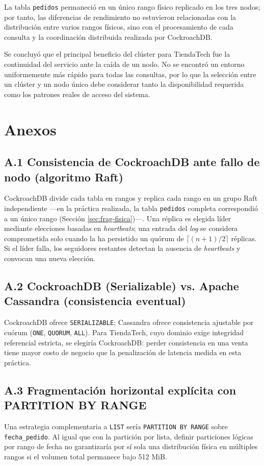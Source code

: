 \documentclass[10pt,letterpaper]{article}
\begin{document}
La tabla \texttt{pedidos} permaneció en un único rango físico replicado en los tres nodos; por tanto, las diferencias de rendimiento no estuvieron relacionadas con la distribución entre varios rangos físicos, sino con el procesamiento de cada consulta y la coordinación distribuida realizada por CockroachDB.

Se concluyó que el principal beneficio del clúster para TiendaTech fue la continuidad del servicio ante la caída de un nodo. No se encontró un entorno uniformemente más rápido para todas las consultas, por lo que la selección entre un clúster y un nodo único debe considerar tanto la disponibilidad requerida como los patrones reales de acceso del sistema.

\section{Anexos}

\subsection*{A.1 Consistencia de CockroachDB ante fallo de nodo (algoritmo Raft)}
CockroachDB divide cada tabla en rangos y replica cada rango en un grupo Raft independiente —en la práctica realizada, la tabla \texttt{pedidos} completa correspondió a un único rango (Sección \ref{sec:frag-fisica})—. Una réplica es elegida líder mediante elecciones basadas en \textit{heartbeats}; una entrada del \textit{log} se considera comprometida solo cuando la ha persistido un quórum de $\lceil (n+1)/2 \rceil$ réplicas. Si el líder falla, los seguidores restantes detectan la ausencia de \textit{heartbeats} y convocan una nueva elección.

\subsection*{A.2 CockroachDB (Serializable) vs. Apache Cassandra (consistencia eventual)}
\label{sec:anexoA2}
CockroachDB ofrece \texttt{SERIALIZABLE}; Cassandra ofrece consistencia ajustable por cuórum (\texttt{ONE}, \texttt{QUORUM}, \texttt{ALL}). Para TiendaTech, cuyo dominio exige integridad referencial estricta, se elegiría CockroachDB: perder consistencia en una venta tiene mayor costo de negocio que la penalización de latencia medida en esta práctica.

\subsection*{A.3 Fragmentación horizontal explícita con PARTITION BY RANGE}
Una estrategia complementaria a \texttt{LIST} sería \texttt{PARTITION BY RANGE} sobre \texttt{fecha\_pedido}. Al igual que con la partición por lista, definir particiones lógicas por rango de fecha no garantizaría por sí sola una distribución física en múltiples rangos si el volumen total permanece bajo 512 MiB.
\end{document}
